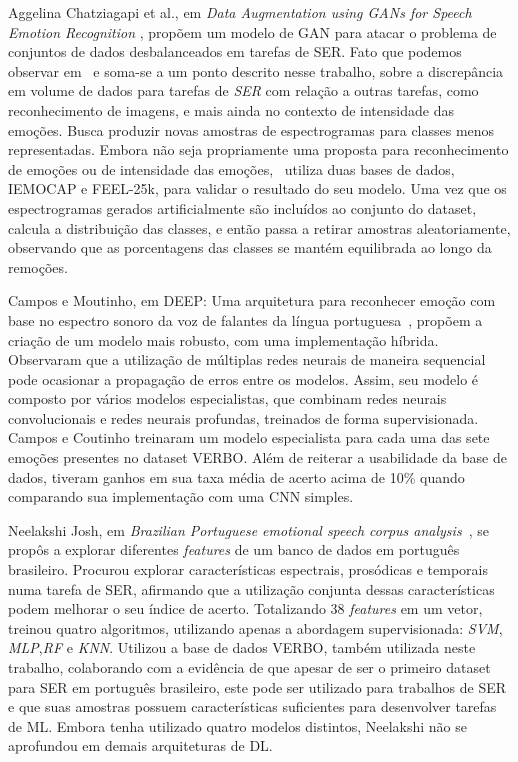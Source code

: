 Aggelina Chatziagapi et al., em \textit{Data Augmentation using GANs for Speech Emotion Recognition }\cite{32.89}, propõem um modelo de \acrshort{GAN} para atacar o problema de conjuntos de dados desbalanceados em tarefas de \acrshort{SER}. Fato que podemos observar em~\cite{32.32} e soma-se a um ponto descrito nesse trabalho, sobre a discrepância em volume de dados para tarefas de \textit{SER} com relação a outras tarefas, como reconhecimento de imagens, e mais ainda no contexto de intensidade das emoções. Busca produzir novas amostras de espectrogramas para classes menos representadas. Embora não seja propriamente uma proposta para reconhecimento de emoções ou de intensidade das emoções,~\cite{32.89} utiliza duas bases de dados, IEMOCAP e FEEL-25k, para validar o resultado do seu modelo. Uma vez que os espectrogramas gerados artificialmente são incluídos ao conjunto do dataset, calcula a distribuição das classes, e então passa a retirar amostras aleatoriamente, observando que as porcentagens das classes se mantém equilibrada ao longo da remoções.

Campos e Moutinho, em DEEP: Uma arquitetura para reconhecer emoção com base no espectro sonoro da voz de falantes da língua portuguesa~\cite{12}, propõem a criação de um modelo mais robusto, com uma implementação híbrida. Observaram que a utilização de múltiplas redes neurais de maneira sequencial pode ocasionar a propagação de erros entre os modelos. Assim, seu modelo é composto por vários modelos especialistas, que combinam redes neurais convolucionais e redes neurais profundas, treinados de forma supervisionada. Campos e Coutinho treinaram um modelo especialista para cada uma das sete emoções presentes no dataset VERBO. Além de reiterar a usabilidade da base de dados, tiveram ganhos em sua taxa média de acerto acima de 10\% quando comparando sua implementação com uma CNN simples.

Neelakshi Josh, em \textit{Brazilian Portuguese emotional speech corpus analysis}~\cite{20}, se propôs a explorar diferentes \textit{features} de um banco de dados em português brasileiro. Procurou explorar características espectrais, prosódicas e temporais numa tarefa de \acrshort{SER}, afirmando que a utilização conjunta dessas características podem melhorar o seu índice de acerto. Totalizando 38 \textit{features} em um vetor, treinou quatro algoritmos, utilizando apenas a abordagem supervisionada: \textit{SVM}, \textit{MLP},\textit{RF} e \textit{KNN}. Utilizou a base de dados VERBO, também utilizada neste trabalho, colaborando com a evidência de que apesar de ser o primeiro dataset para \acrshort{SER} em português brasileiro, este pode ser utilizado para trabalhos de \acrshort{SER} e que suas amostras possuem características suficientes para desenvolver tarefas de \acrshort{ML}. Embora tenha utilizado quatro modelos distintos, Neelakshi não se aprofundou em demais arquiteturas de \acrshort{DL}.

